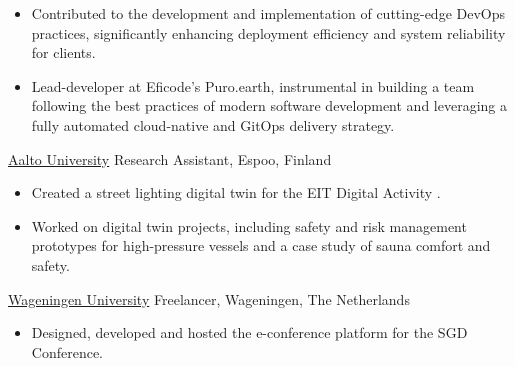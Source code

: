 {{\begin{itemize}[leftmargin=0.6cm, label={\textbullet}]
\begin{itemize}
 		      	\item
 		      	      : 

                    \item 
                            :
 		      \end{itemize}
 		       		      		                      
 		\item Contributed to the development and implementation of cutting-edge DevOps practices, significantly enhancing deployment efficiency and system reliability for clients.
 		       		      		      
 		\item Lead-developer at Eficode's {} Puro.earth, instrumental in building a team following the best practices of modern software development and leveraging a fully automated cloud-native and GitOps delivery strategy.
 	\end{itemize}
 }
  
 {{\color{blue}\href{https://www.aalto.fi/en}{Aalto University}}}
 {Research Assistant,}
 {Espoo, Finland}
 {}{}
 {
 	\begin{itemize}[leftmargin=0.6cm, label={\textbullet}]
 		\item Created a street lighting digital twin for the EIT Digital Activity .
 		\item Worked on digital twin projects, including safety and risk management prototypes for high-pressure vessels and a case study of sauna comfort and safety.
 	\end{itemize}
 }
  
 {{\color{blue}\href{https://wur.nl/en}{Wageningen University}}}
 {Freelancer,}
 {Wageningen, The Netherlands}
 {}{}
 {
 	\begin{itemize}[leftmargin=0.6cm, label={\textbullet}]
 		\item Designed, developed and hosted the e-conference platform  for the SGD Conference.
 	\end{itemize}
 }
  
}
